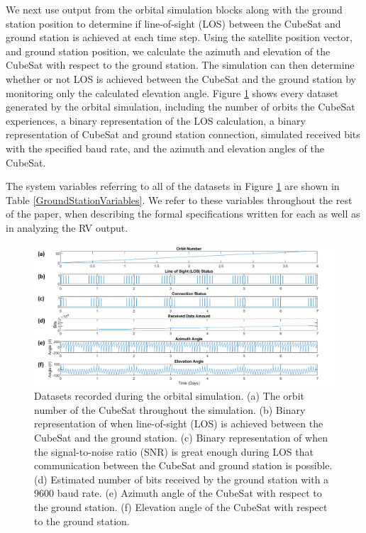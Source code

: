 \documentclass[conf]{new-aiaa}
\begin{document}
We next use output from the orbital simulation blocks along with the ground station position to determine if line-of-sight (LOS) between the CubeSat and ground station is achieved at each time step. Using the satellite position vector, and ground station position, we calculate the azimuth and elevation of the CubeSat with respect to the ground station. The simulation can then determine whether or not LOS is achieved between the CubeSat and the ground station by monitoring only the calculated elevation angle. Figure \ref{OrbitalDatasets} shows every dataset generated by the orbital simulation, including the number of orbits the CubeSat experiences, a binary representation of the LOS calculation, a binary representation of CubeSat and ground station connection, simulated received bits with the specified baud rate, and the azimuth and elevation angles of the CubeSat.

The system variables referring to all of the datasets in Figure \ref{OrbitalDatasets} are shown in Table \ref{GroundStationVariables}. We refer to these variables throughout the rest of the paper, when describing the formal specifications written for each as well as in analyzing the RV output.

\begin{figure}[!ht]
\centering
\includegraphics[width=1\textwidth]{Fig/OrbitSimulationDataUpdated5.png}
\caption{Datasets recorded during the orbital simulation. (a) The orbit number of the CubeSat throughout the simulation. (b) Binary representation of when line-of-sight (LOS) is achieved between the CubeSat and the ground station. (c) Binary representation of when the signal-to-noise ratio (SNR) is great enough during LOS that communication between the CubeSat and ground station is possible. (d) Estimated number of bits received by the ground station with a 9600 baud rate. (e) Azimuth angle of the CubeSat with respect to the ground station. (f) Elevation angle of the CubeSat with respect to the ground station.}
\label{OrbitalDatasets}
\end{figure}
\end{document}
